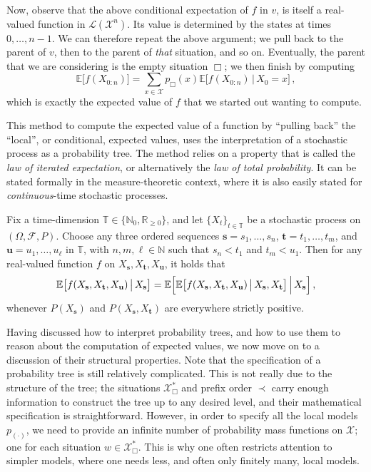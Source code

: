 \documentclass[graybox]{svmult}
\newcommand{\nats}{\mathbb{N}}
\newcommand{\natswith}{\nats_{0}}
\newcommand{\reals}{\mathbb{R}}
\newcommand{\realsnonneg}{\reals_{\geq 0}}
\newcommand{\states}{\mathcal{X}}
\newcommand{\gambles}{\mathcal{L}}
\newcommand{\timedim}{\mathbb{T}}
\begin{document}
Now, observe that the above conditional expectation of $f$ in $v$, is itself a real-valued function in $\gambles(\states^n)$. Its value is determined by the states at times $0,\ldots,n-1$. We can therefore repeat the above argument; we pull back to the parent of $v$, then to the parent of \emph{that} situation, and so on. Eventually, the parent that we are considering is the empty situation $\Box$; we then finish by computing
\begin{equation*}
\mathbb{E}\bigl[f(X_{0:n})\bigr] = \sum_{x\in\states} p_\Box(x) \mathbb{E}\bigl[f(X_{0:n})\,\big\vert\,X_0=x\bigr]\,,
\end{equation*}
which is exactly the expected value of $f$ that we started out wanting to compute.

This method to compute the expected value of a function by ``pulling back'' the ``local'', or conditional, expected values, uses the interpretation of a stochastic process as a probability tree. The method relies on a property that is called the \emph{law of iterated expectation}, or alternatively the \emph{law of total probability}. It can be stated formally in the measure-theoretic context, where it is also easily stated for \emph{continuous}-time stochastic processes.
\begin{theorem}
Fix a time-dimension $\timedim\in\{\natswith,\realsnonneg\}$, and let $\{X_t\}_{t\in\timedim}$ be a stochastic process on $(\Omega,\mathcal{F},P)$. Choose any three ordered sequences $\mathbf{s}=s_1,\ldots,s_n$, $\mathbf{t}=t_1,\ldots,t_m$, and $\mathbf{u}=u_1,\ldots,u_\ell$ in $\timedim$, with $n,m,\ell\in\nats$ such that $s_n<t_1$ and $t_m<u_1$. Then for any real-valued function $f$ on $X_\mathbf{s},X_\mathbf{t},X_\mathbf{u}$, it holds that
\begin{equation*}
\mathbb{E}\bigl[f(X_\mathbf{s},X_\mathbf{t},X_\mathbf{u})\,\big\vert\,X_\mathbf{s}\bigr] = \mathbb{E}\Bigl[\mathbb{E}\bigl[f(X_\mathbf{s},X_\mathbf{t},X_\mathbf{u})\,\big\vert\,X_\mathbf{s},X_\mathbf{t}\bigr]\,\Big\vert\,X_\mathbf{s}\Bigr]\,,
\end{equation*} 
whenever $P(X_\mathbf{s})$ and $P(X_\mathbf{s},X_\mathbf{t})$ are everywhere strictly positive.
\end{theorem}

Having discussed how to interpret probability trees, and how to use them to reason about the computation of expected values, we now move on to a discussion of their structural properties. Note that the specification of a probability tree is still relatively complicated. This is not really due to the structure of the tree; the situations $\states^*_\Box$ and prefix order $\prec$ carry enough information to construct the tree up to any desired level, and their mathematical specification is straightforward. However, in order to specify all the local models $p_{(\cdot)}$, we need to provide an infinite number of probability mass functions on $\states$; one for each situation $w\in\states^*_\Box$. This is why one often restricts attention to simpler models, where one needs less, and often only finitely many, local models.
\end{document}
